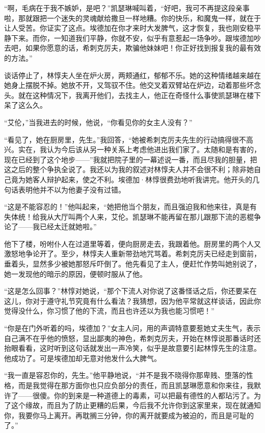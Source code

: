 \par “啊，毛病在于我不嫉妒，是吧？”凯瑟琳喊叫着，“好吧，我可不再提这段亲事啦，那就跟把一个迷失的灵魂献给撒旦一样地糟。你的快乐，和魔鬼一样，就在于让人受苦。你证实了这点。埃德加在你才来时大发脾气，这才恢复，我也刚安稳平静下来。而你，一知道我们平静，你就不安，似乎有意惹起一场争吵。跟埃德加吵去吧，如果你愿意的话，希刺克厉夫，欺骗他妹妹吧！你正好找到报复我的最有效的方法。”
\par 谈话停止了，林惇夫人坐在炉火房，两颊通红，郁郁不乐。她的这种情绪越来越在她身上摆脱不掉。她放不开，又驾驭不住。他交叉着双臂站在炉边，动着那些坏念头。就在这种情况下，我离开他们，去找主人，他正在奇怪什么事使凯瑟琳在楼下呆了这么久。
\par “艾伦，”当我进去的时候，他说，“你看见你的女主人没有？”
\par “看见了，她在厨房里，先生。”我回答，“她被希刺克厉夫先生的行动搞得很不高兴。实在，我认为今后该从另一种关系上考虑他进出我们家了。太随和是有害的，现在已经到了这个地步——”我就把院子里的一幕述说一番，而且尽我的胆量，把这之后的整个争执全说了。我还以为我的叙述对林惇夫人并不会很不利；除非她自己竟为她客人辩护起来，使之不利。埃德加·林惇很费劲地听我讲完。他开头的几句话表明他并不以为他妻子没有过错。
\par “这是不能容忍的！”他叫起来，“她把他当个朋友，而且强迫我和他来往，真是有失体统！给我从大厅叫两个人来，艾伦。凯瑟琳不能再留在那儿跟那下流的恶棍争论了——我已经太迁就她啦。”
\par 他下了楼，吩咐仆人在过道里等着，便向厨房走去，我跟着他。厨房里的两个人又激怒地争论开了。至少，林惇夫人重新带劲地咒骂着。希刺克厉夫已经走到窗前，垂着头，显然多少被她那怒斥吓倒了。他先看见了主人，便赶忙作势叫她别说了，她一发现他的暗示的原因，便顿时服从了他。
\par “这是怎么回事？”林惇对她说，“那个下流人对你说了这番怪话之后，你还要呆在这儿，你对于遵守礼节究竟有什么看法？我猜想，因为他平常就这样谈话，因此你觉得没什么，你习惯了他的下流，而且也许还以为我也能习惯吧！”
\par “你是在门外听着的吗，埃德加？”女主人问，用的声调特意要惹她丈夫生气，表示自己满不在乎他的愤怒，显出鄙夷的神色，希刺克厉夫，开始在林惇说那番话时还抬眼看看，这时听到这句话就发出一声冷笑，似乎是故意要引起林惇先生的注意。他成功了。可是埃德加却无意对他发什么大脾气。
\par “我一直是容忍你的，先生。”他平静地说，“并不是我不晓得你那卑贱、堕落的性格，而是我觉得在那方面你也只应负部分的责任，而且凯瑟琳愿意和你来往，我默许了——很傻。你的到来是一种道德上的毒素，可以把最有德性的人都玷污了。为了这个缘故，而且为了防止更糟的后果，今后我不允许你到这家里来，现在就通知你，我要你马上离开。再耽搁三分钟，你的离开就要成为被迫的，而且是可耻的了。”
